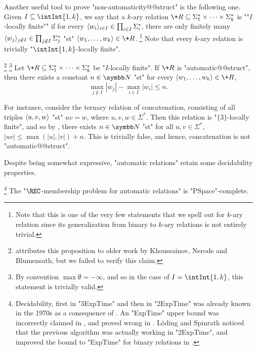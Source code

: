 Another useful tool to prove "non-automaticity@@struct" is the following one.
Given $I \subseteq \intInt{1,k}$,
we say that a $k$-ary relation $\+R \subseteq \Sigma_1^* \times \cdots \times \Sigma_k^*$ is
""$I$-locally finite"" if for every $\langle w_i\rangle_{i\in I} \in \prod_{i\in I} \Sigma_i^*$,
there are only finitely many $\langle w_j\rangle_{j\not\in I} \in \prod_{j \not\in I} \Sigma_j^*$
"st" $\tup{w_1,\dotsc,w_k} \in \+R$.%
\footnote{Note that this is one of the very few statements
that we spell out for $k$-ary relation since its generalization from binary to $k$-ary relations
is not entirely trivial.}
Note that every $k$-ary relation is trivially "$\intInt{1,k}$-locally finite".
\begin{proposition}
	\label{prop:non-synchronous}
	\!\footnote{\cite{KhoussainovNiesRubinStephan2007Automatic} attributes this proposition
	to older work by Khoussainov, Nerode and Blumensath, but we failed to verify this claim.}%
	\footnote{By convention $\max{\emptyset} = -\infty$, and so in the case
	of $I = \intInt{1,k}$, this statement is trivially valid.}
	\AP\label{prop:bound-automatic-structures}
	Let $\+R \subseteq \Sigma_1^* \times \cdots \times \Sigma_k^*$ be "$I$-locally finite".
	If $\+R$ is "automatic@@struct", then there exists a constant $n\in\N$ "st" for every
	$\tup{w_1,\dotsc,w_k} \in \+R$,
	\[
		\max_{j \not\in I}{|w_j|} - \max_{i \in I}{|w_i|} \leq n.
	\]
\end{proposition}

For instance, consider the ternary relation of concatenation,
consisting of all triples $\langle u,v,w\rangle$ "st" $uv = w$, where $u,v,w\in\Sigma^*$.
Then this relation is "$\{3\}$-locally finite", and so by
, there exists $n\in \N$
"st" for all $u,v \in \Sigma^*$, $|uv| \leq \max{(|u|,|v|)} + n$.
This is trivially false, and hence, concatenation is not "automatic@@struct".

Despite being somewhat expressive, "automatic relations" retain some decidability properties. 
\begin{proposition}
	\!\footnote{Decidability, first in "3ExpTime" and then
	in "2ExpTime" was already known in the 1970s as a consequence
	of .
	An "ExpTime" upper bound was incorrectly claimed in \cite[Table~1]{CartonChoffrutGrigorieff2006DecisionProblems},
	and proved wrong in \cite[\S~4.1]{LodingSpinrath2019DecisionProblems}.
	Löding and Spinrath noticed that the previous algorithm was
	actually working in "2ExpTime", and improved 
	the bound to "ExpTime" for binary relations
	in \cite[Corollary~22]{LodingSpinrath2019DecisionProblems}.}
	The "$\REC$-membership problem for automatic relations" is "PSpace"-complete.
\end{proposition}

